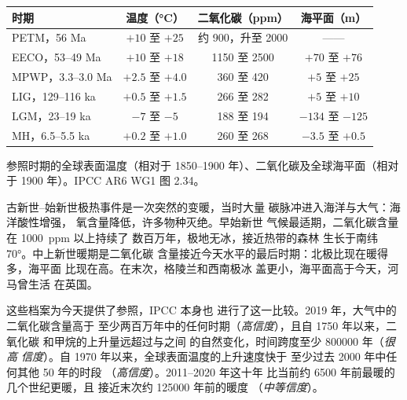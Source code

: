 \begin{center}
\small
\begin{tabular}{|l|c|c|c|}
\hline
\textbf{时期} & \textbf{温度（\unit{\degreeCelsius}）} & \textbf{二氧化碳（ppm）} & \textbf{海平面（m）} \\
\hline
PETM，56 Ma & $+10$ 至 $+25$ & 约 900，升至 2000 &——\\
EECO，53--49 Ma & $+10$ 至 $+18$ & 1150 至 2500 & $+70$ 至 $+76$ \\
MPWP，3.3--3.0 Ma & $+2.5$ 至 $+4.0$ & 360 至 420 & $+5$ 至 $+25$ \\
LIG，129--116 ka & $+0.5$ 至 $+1.5$ & 266 至 282 & $+5$ 至 $+10$ \\
\textcolor{omCold}{LGM，23--19 ka} & \textcolor{omCold}{$-7$ 至 $-5$} & \textcolor{omCold}{188 至 194} & \textcolor{omCold}{$-134$ 至 $-125$} \\
MH，6.5--5.5 ka & $+0.2$ 至 $+1.0$ & 260 至 268 & $-3.5$ 至 $+0.5$ \\
\hline
\end{tabular}

\medskip
{\small 参照时期的全球表面温度（相对于
1850--1900 年）、二氧化碳及全球海平面（相对于 1900 年）。IPCC
AR6 WG1 图 2.34。}
\end{center}

古新世–始新世极热事件是一次突然的变暖，当时大量
碳脉冲进入海洋与大气：海洋酸性增强，
氧含量降低，许多物种灭绝。早始新世
气候最适期，二氧化碳含量在 \qty{1000}{ppm} 以上持续了
数百万年，极地无冰，接近热带的森林
生长于南纬 \ang{70}。中上新世暖期是二氧化碳
含量接近今天水平的最后时期：北极比现在暖得多，海平面
比现在高。在末次，格陵兰和西南极冰
盖更小，海平面高于今天，河马曾生活
在英国。

这些档案为今天提供了参照，IPCC 本身也
进行了这一比较。2019 年，大气中的二氧化碳含量高于
至少两百万年中的任何时期（\emph{高信度}），且自 1750 年以来，二氧化碳
和甲烷的上升量远超过与之间
的自然变化，时间跨度至少 \num{800000} 年（\emph{很高
信度}）。自 1970 年以来，全球表面温度的上升速度快于
至少过去 \num{2000} 年中任何其他 50 年的时段
（\emph{高信度}）。2011--2020 年这十年
比当前约 \num{6500} 年前最暖的几个世纪更暖，且
接近末次约 \num{125000} 年前的暖度
（\emph{中等信度}）。

